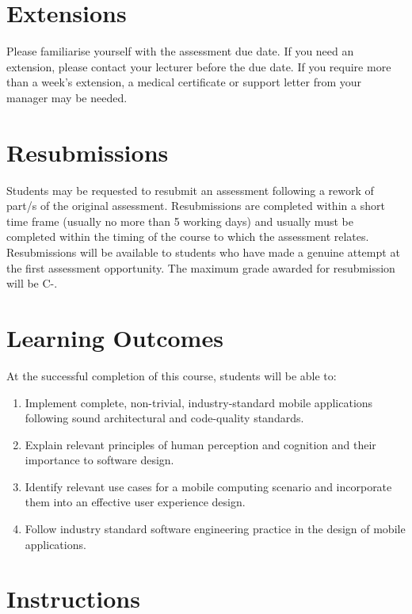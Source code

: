 \documentclass{article}
\begin{document}
\section*{Extensions}
Please familiarise yourself with the assessment due date. If you need an extension, please contact your lecturer before the due date. If you require more than a week's extension, a medical certificate or support letter from your manager may be needed.

\section*{Resubmissions}
Students may be requested to resubmit an assessment following a rework of part/s of the original assessment. Resubmissions are completed within a short time frame (usually no more than 5 working days) and usually must be completed within the timing of the course to which the assessment relates. Resubmissions will be available to students who have made a genuine attempt at the first assessment opportunity. The maximum grade awarded for resubmission will be C-.

\section*{Learning Outcomes}
At the successful completion of this course, students will be able to:
\begin{enumerate}
    \item Implement complete, non-trivial, industry-standard mobile applications following sound architectural and code-quality standards.
    \item Explain relevant principles of human perception and cognition and their importance to software design.
    \item Identify relevant use cases for a mobile computing scenario and incorporate them into an effective user experience design.
    \item Follow industry standard software engineering practice in the design of mobile applications.
\end{enumerate}

\newpage

\section*{Instructions} 
\end{document}
